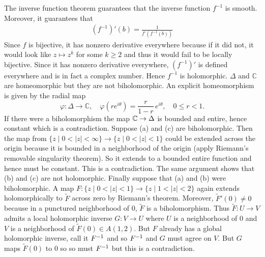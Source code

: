 \documentclass[12pt]{article}  %
\begin{document}
\begin{solution}
    The inverse function theorem guarantees that the inverse function $f^{-1}$ is smooth. Moreover, it guarantees that
    \begin{align*}
        (f^{-1})'(b) = \frac{1}{f'(f^{-1}(b))}
    \end{align*}
    Since $f$ is bijective, it has nonzero derivative everywhere because if it did not, it would look like $z\mapsto z^k$ for some $k\geq 2$ and thus it would fail to be locally bijective. Since it has nonzero derivative everywhere, $(f^{-1})'$ is defined everywhere and is in fact a complex number. Hence $f^{-1}$ is holomorphic. $\Delta$ and $\mathbb{C}$ are homeomorphic but they are not biholomorphic. An explicit homeomorphism is given by the radial map
    \[
        \varphi \colon \Delta \to \mathbb{C}, \quad
        \varphi(re^{i\theta}) = \frac{r}{1-r}\,e^{i\theta}, \quad 0 \le r < 1.
    \]
    If there were a biholomorphism the map $\mathbb{C}\to\Delta$ is bounded and entire, hence constant which is a contradiction. Suppose (a) and (c) are biholomorphic. Then the map from $\{z \mid 0 < |z| < \infty\} \to \{z \mid 0 < |z| < 1\}$ could be extended across the origin because it is bounded in a neighborhood of the origin (apply Riemann's removable singularity theorem). So it extends to a bounded entire function and hence must be constant. This is a contradiction. The same argument shows that (b) and (c) are not holomorphic. Finally suppose that (a) and (b) were biholomorphic. A map $F:\{z \mid 0 < |z| < 1\} \to \{z \mid 1 < |z| < 2\}$ again extends holomorphically to $\tilde F$ across zero by Riemann's theorem. Moreover, $\tilde F'(0)\neq 0$ because in a punctured neighborhood of $0$, $\tilde F$ is a biholomorphism. Thus $\tilde F:U \to V$ admits a local holomorphic inverse $G:V\to U$ where $U$ is a neighborhood of $0$ and $V$ is a neighborhood of $\tilde F(0) \in A(1,2)$. But $F$ already has a global holomorphic inverse, call it ${F}^{-1}$ and so ${F}^{-1}$ and $G$ must agree on $V$. But $G$ maps $\tilde F(0)$ to $0$ so so must ${F}^{-1}$ but this is a contradiction.
\end{solution}
\end{document}
